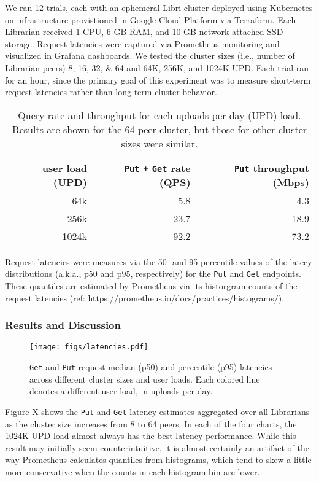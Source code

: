 \documentclass[10pt]{article}
\newcommand{\ttt}[1]{\texttt{#1}}
\def\Put{\ttt{Put}}
\def\Get{\ttt{Get}}
\begin{document}
We ran 12 trials, each with an ephemeral Libri cluster deployed using Kubernetes on infrastructure provistioned in Google Cloud Platform via Terraform. Each Librarian received 1 CPU, 6 GB RAM, and 10 GB network-attached SSD storage. Request latencies were captured via Prometheus monitoring and visualized in Grafana dashboards. We tested the cluster sizes (i.e., number of Librarian peers) 8, 16, 32, \& 64 and 64K, 256K, and 1024K UPD. Each trial ran for an hour, since the primary goal of this experiment was to measure short-term request latencies rather than long term cluster behavior. 

\begin{table}[t]
\centering
\begin{tabular}{rrr}
	\toprule
	user load (UPD) & \Put{} \ttt{+} \Get{} rate (QPS) & \Put{} throughput (Mbps) \\ \midrule
	64k & 5.8 & 4.3 \\
	256k & 23.7 & 18.9 \\
	1024k & 92.2 & 73.2 \\ \bottomrule
\end{tabular}
\caption{Query rate and throughput for each uploads per day (UPD) load. Results are shown for the 64-peer cluster, but those for other cluster sizes were similar.}
\end{table}

Request latencies were measures via the 50- and 95-percentile values of the latecy distributions (a.k.a., p50 and p95, respectively) for the \ttt{Put} and \texttt{Get} endpoints. These quantiles are estimated by Prometheus via its historgram counts of the request latencies (ref: https://prometheus.io/docs/practices/histograms/).  

\subsubsection{Results and Discussion}

\begin{figure}[t]
	\centering
	\texttt{[image: figs/latencies.pdf]}
	\caption{\Get{} and \Put{} request median (p50) and  percentile (p95) latencies across different cluster sizes and user loads. Each colored line denotes a different user load, in uploads per day.}
\end{figure}

Figure X shows the \ttt{Put} and \texttt{Get} latency estimates aggregated over all Librarians as the cluster size increases from 8 to 64 peers. In each of the four charts, the 1024K UPD load almost always has the best latency performance. While this result may initially seem counterintuitive, it is almost certainly an artifact of the way Prometheus calculates quantiles from histograms, which tend to skew a little more conservative when the counts in each histogram bin are lower. 
\end{document}
